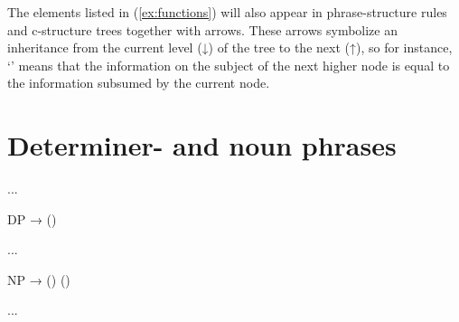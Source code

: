 The elements listed in (\ref{ex:functions}) will also appear in 
phrase-structure rules and c-structure trees together with arrows. These arrows 
symbolize an inheritance from the current level (↓) of the tree to the next 
(↑), so for instance, `\pass{\Subj}' means that the information on the subject 
of the next higher node is equal to the information subsumed by the current 
node.

\section{Determiner- and noun phrases}

...

\ex\begin{minipage}[t]{.5\linewidth}
DP →  () \\
\end{minipage}
\xe

...

\ex\begin{minipage}[t]{.5\linewidth}
NP →  () ()
\end{minipage}
\xe

...

%
%
%
%

